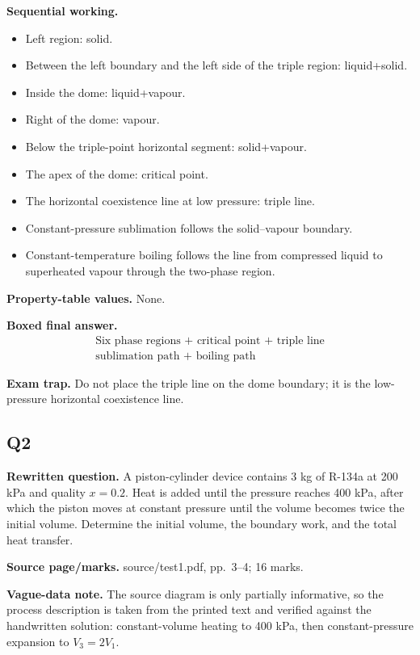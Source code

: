 \textbf{Sequential working.}
\begin{itemize}
  \item Left region: solid.
  \item Between the left boundary and the left side of the triple region: liquid+solid.
  \item Inside the dome: liquid+vapour.
  \item Right of the dome: vapour.
  \item Below the triple-point horizontal segment: solid+vapour.
  \item The apex of the dome: critical point.
  \item The horizontal coexistence line at low pressure: triple line.
  \item Constant-pressure sublimation follows the solid--vapour boundary.
  \item Constant-temperature boiling follows the line from compressed liquid to superheated vapour through the two-phase region.
\end{itemize}

\textbf{Property-table values.} None.

\textbf{Boxed final answer.}
\[
\boxed{\begin{gathered}\text{Six phase regions + critical point + triple line}\\\text{sublimation path + boiling path}\end{gathered}}
\]

\textbf{Exam trap.} Do not place the triple line on the dome boundary; it is the low-pressure horizontal coexistence line.


\subsection*{Q2}
\textbf{Rewritten question.} A piston-cylinder device contains 3 kg of R-134a at 200 kPa and quality $x=0.2$. Heat is added until the pressure reaches 400 kPa, after which the piston moves at constant pressure until the volume becomes twice the initial volume. Determine the initial volume, the boundary work, and the total heat transfer.

\textbf{Source page/marks.} source/test1.pdf, pp.~3--4; 16 marks.

\textbf{Vague-data note.} The source diagram is only partially informative, so the process description is taken from the printed text and verified against the handwritten solution: constant-volume heating to 400 kPa, then constant-pressure expansion to $V_3=2V_1$.

